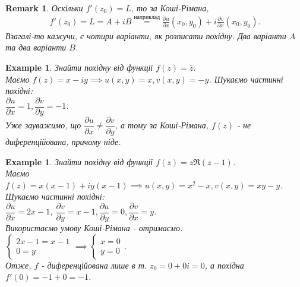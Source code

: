 \documentclass[a4paper, 10pt]{article}
\theoremstyle{theoremdd}
\theoremstyle{theoremdd}
\theoremstyle{theoremdd}
\theoremstyle{theoremdd}
\newtheorem{example}[theorem]{Example}
\theoremstyle{theoremdd}
\theoremstyle{theoremdd}
\newtheorem{remark}[theorem]{Remark}
\theoremstyle{theoremdd}
\theoremstyle{theoremdd}
\def\departial#1#2{\dfrac{\partial {#1}}{\partial {#2}}}
\begin{document}
\begin{remark}
Оскільки $f'(z_0)=L$, то за Коші-Рімана,
\begin{align*}
	f'(z_0) = L = A+iB \overset{\text{наприклад}}{=} \frac{\partial u}{\partial x}(x_0,y_0) + i\frac{\partial v}{\partial x}(x_0,y_0).
\end{align*}
Взагалі-то кажучи, є чотири варіанти, як розписати похідну. Два варіанти $A$ та два варіанти $B$.
\end{remark}

\begin{example}
Знайти похідну від функції $f(z) = \bar{z}$.\\
Маємо $f(z) = x-iy \implies u(x,y) = x, v(x,y) = -y$. Шукаємо частинні похідні:\\
$\departial{u}{x} = 1, \departial{v}{y} = -1$.\\ Уже зауважимо, що $\departial{u}{x} \neq \departial{v}{y}$, а тому за Коші-Рімана, $f(z)$ - не диференційована, причому ніде.
\end{example}

\begin{example}
Знайти похідну від функції $f(z) = z \Re (z-1)$.\\
Маємо $f(z) = x(x-1) + iy(x-1) \implies u(x,y) = x^2-x, v(x,y) = xy-y$. Шукаємо частинні похідні:\\
$\departial{u}{x} = 2x-1$, $\departial{v}{y} = x-1, \departial{u}{y} = 0, \departial{v}{x} = y$.\\
Використаємо умову Коші-Рімана - отримаємо:\\
$\begin{cases} 2x-1 = x-1 \\ 0 = y \end{cases} \implies \begin{cases} x =0 \\ y = 0 \end{cases}$.\\
Отже, $f$ - диференційована лише в т. $z_0 = 0+0i = 0$, а похідна\\
$f'(0) = -1+0 = -1$.
\end{example}
\end{document}
